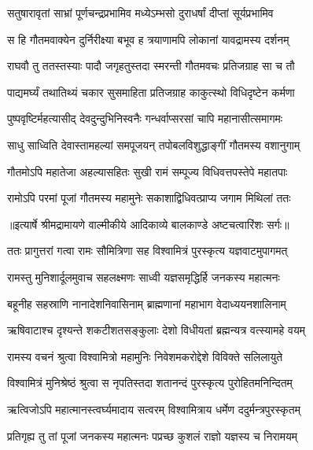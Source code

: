 \twolineshloka
{सतुषारावृतां साभ्रां पूर्णचन्द्रप्रभामिव}
{मध्येऽम्भसो दुराधर्षां दीप्तां सूर्यप्रभामिव} %

\twolineshloka
{स हि गौतमवाक्येन दुर्निरीक्ष्या बभूव ह}
{त्रयाणामपि लोकानां यावद्रामस्य दर्शनम्} %

\twolineshloka
{राघवौ तु ततस्तस्याः पादौ जगृहतुस्तदा}
{स्मरन्ती गौतमवचः प्रतिजग्राह सा च तौ} %

\twolineshloka
{पाद्यमर्घ्यं तथातिथ्यं चकार सुसमाहिता}
{प्रतिजग्राह काकुत्स्थो विधिदृष्टेन कर्मणा} %

\twolineshloka
{पुष्पवृष्टिर्महत्यासीद् देवदुन्दुभिनिस्वनैः}
{गन्धर्वाप्सरसां चापि महानासीत्समागमः} %

\twolineshloka
{साधु साध्विति देवास्तामहल्यां समपूजयन्}
{तपोबलविशुद्धाङ्गीं गौतमस्य वशानुगाम्} %

\twolineshloka
{गौतमोऽपि महातेजा अहल्यासहितः सुखी}
{रामं सम्पूज्य विधिवत्तपस्तेपे महातपाः} %

\twolineshloka
{रामोऽपि परमां पूजां गौतमस्य महामुनेः}
{सकाशाद्विधिवत्प्राप्य जगाम मिथिलां ततः} %


{॥इत्यार्षे श्रीमद्रामायणे वाल्मीकीये आदिकाव्ये बालकाण्डे अष्टचत्वारिंशः सर्गः॥}


\twolineshloka
{ततः प्रागुत्तरां गत्वा रामः सौमित्रिणा सह}
{विश्वामित्रं पुरस्कृत्य यज्ञवाटमुपागमत्} %

\twolineshloka
{रामस्तु मुनिशार्दूलमुवाच सहलक्ष्मणः}
{साध्वी यज्ञसमृद्धिर्हि जनकस्य महात्मनः} %

\twolineshloka
{बहूनीह सहस्राणि नानादेशनिवासिनाम्}
{ब्राह्मणानां महाभाग वेदाध्ययनशालिनाम्} %

\twolineshloka
{ऋषिवाटाश्च दृश्यन्ते शकटीशतसङ्कुलाः}
{देशो विधीयतां ब्रह्मन्यत्र वत्स्यामहे वयम्} %

\twolineshloka
{रामस्य वचनं श्रुत्वा विश्वामित्रो महामुनिः}
{निवेशमकरोद्देशे विविक्ते सलिलायुते} %

\twolineshloka
{विश्वामित्रं मुनिश्रेष्ठं श्रुत्वा स नृपतिस्तदा}
{शतानन्दं पुरस्कृत्य पुरोहितमनिन्दितम्} %

\twolineshloka
{ऋत्विजोऽपि महात्मानस्त्वर्घ्यमादाय सत्वरम्}
{विश्वामित्राय धर्मेण ददुर्मन्त्रपुरस्कृतम्} %

\twolineshloka
{प्रतिगृह्य तु तां पूजां जनकस्य महात्मनः}
{पप्रच्छ कुशलं राज्ञो यज्ञस्य च निरामयम्} %

